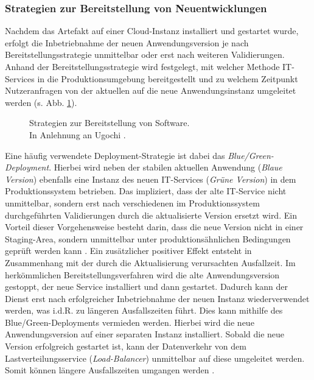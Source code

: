 \subsubsection{Strategien zur Bereitstellung von Neuentwicklungen}
\label{sec:Bereitstellungs_Strategien}
Nachdem das Artefakt auf einer Cloud-Instanz installiert und gestartet wurde, erfolgt die Inbetriebnahme der neuen Anwendungsversion je nach Bereitstellungsstrategie unmittelbar oder erst nach weiteren Validierungen. Anhand der Bereitstellungsstrategie wird festgelegt, mit welcher Methode IT-Services in die Produktionsumgebung bereitgestellt und zu welchem Zeitpunkt Nutzeranfragen von der aktuellen auf die neue Anwendungsinstanz umgeleitet werden (s. Abb. \ref{fig:DS}).
\begin{center}
	\begin{figure}[H]
		\centering
		\caption[Strategien zur Bereitstellung von Software]{Strategien zur Bereitstellung von Software.\\ In Anlehnung an Ugochi \cite{Ugochi.20220503}.}
		\label{fig:DS}
	\end{figure}
\end{center}
\vspace*{-15mm}
Eine häufig verwendete Deployment-Strategie ist dabei das \textit{Blue/Green-Deployment}. Hierbei wird neben der stabilen aktuellen Anwendung (\textit{Blaue Version}) ebenfalls eine Instanz des neuen IT-Services (\textit{Grüne Version}) in dem Produktionssystem betrieben. Das impliziert, dass der alte IT-Service nicht unmittelbar, sondern erst nach verschiedenen im Produktionssystem durchgeführten Validierungen durch die aktualisierte Version ersetzt wird. Ein Vorteil dieser Vorgehensweise besteht darin, dass die neue Version nicht in einer Staging-Area, sondern unmittelbar unter produktionsähnlichen Bedingungen geprüft werden kann \cite{Ugochi.20220503}. Ein zusätzlicher positiver Effekt entsteht in Zusammenhang mit der durch die Aktualisierung verursachten Ausfallzeit. Im herkömmlichen Bereitstellungsverfahren wird die alte Anwendungsversion gestoppt, der neue Service installiert und dann gestartet. Dadurch kann der Dienst erst nach erfolgreicher Inbetriebnahme der neuen Instanz wiederverwendet werden, was i.d.R. zu längeren Ausfallszeiten führt. Dies kann mithilfe des Blue/Green-Deployments vermieden werden. Hierbei wird die neue Anwendungsversion  auf einer separaten Instanz installiert. Sobald die neue Version erfolgreich gestartet ist, kann der Datenverkehr von dem Lastverteilungsservice (\textit{Load-Balancer}) unmittelbar auf diese umgeleitet werden. Somit können längere Ausfallszeiten umgangen werden \cite[1083]{Rudrabhatla.10720201092020}. 
